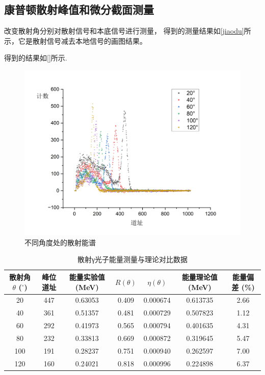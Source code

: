 \documentclass[font=default]{mpltx}
\begin{document}
    \subsection{康普顿散射峰值和微分截面测量}

    改变散射角分别对散射信号和本底信号进行测量， 得到的测量结果如\autoref{jiaodu}所示，它是散射信号减去本地信号的画图结果。
    
    得到的结果如\autoref{}所示.

      \begin{figure}[htbp]
        \centering
        \includegraphics[width=0.85\linewidth]{fig/jiaodu.png}
        \caption{不同角度处的散射能谱}
        \label{fig:jiaodu}
      \end{figure}

      \begin{table}[htbp]
        \centering
        \caption{散射γ光子能量测量与理论对比数据} %
        \begin{tabular}{ccccccc}
            \toprule %
            散射角 $\theta$ ($^\circ$) & 峰位道址 & 能量实验值 (MeV) & $R(\theta)$ & $\eta(\theta)$ & 能量理论值 (MeV) & 能量偏差 (\%) \\
            \midrule %
            20 & 447 & 0.63053 & 0.409 & 0.000674 & 0.613735 & 2.66 \\
            40 & 361 & 0.51357 & 0.481 & 0.000729 & 0.507823 & 1.12 \\
            60 & 292 & 0.41973 & 0.565 & 0.000794 & 0.401635 & 4.31 \\
            80 & 232 & 0.33813 & 0.669 & 0.000872 & 0.319645 & 5.47 \\
            100 & 191 & 0.28237 & 0.751 & 0.000940 & 0.262597 & 7.00 \\
            120 & 160 & 0.24021 & 0.818 & 0.000996 & 0.224898 & 6.37 \\
            \bottomrule %
        \end{tabular}
        \label{tab:gamma_scattering_energy} %
      \end{table}
\end{document}
